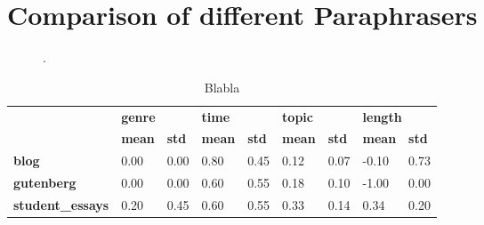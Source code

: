 \section{Comparison of different Paraphrasers}

\begin{figure}[htbp]
    \centering
    
    \caption{.}
    \label{fig:extraction_eval}
\end{figure}

\begin{table}[]
\centering
\caption{Blabla}
\label{tab:extraction_eval_stats}
\begin{tabular}{lllllllll}
\toprule
 &
  \multicolumn{2}{l}{\textbf{genre}} &
  \multicolumn{2}{l}{\textbf{time}} &
  \multicolumn{2}{l}{\textbf{topic}} &
  \multicolumn{2}{l}{\textbf{length}} \\
 &
  \textbf{mean} &
  \textbf{std} &
  \textbf{mean} &
  \textbf{std} &
  \textbf{mean} &
  \textbf{std} &
  \textbf{mean} &
  \textbf{std} \\
  \midrule
\textbf{blog}            & 0.00 & 0.00  & 0.80 & 0.45 & 0.12  & 0.07  & -0.10 & 0.73 \\
\textbf{gutenberg}       & 0.00 & 0.00  & 0.60 & 0.55 & 0.18 & 0.10 & -1.00 & 0.00  \\
\textbf{student\_essays} & 0.20 & 0.45 & 0.60 & 0.55 & 0.33 & 0.14  & 0.34 & 0.20 \\
  \bottomrule
\end{tabular}%
\end{table}